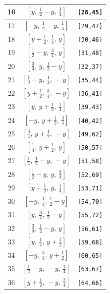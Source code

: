 \documentclass[fleqn,8pt]{jsarticle}
\begin{document}
\begin{longtable}{ccc}
16 & $\left[ y,\, \frac{1}{2} - y,\, \frac{3}{4} \right]$ & {\tt [28,45]} \\ \hline
17 & $\left[ - y,\, \frac{1}{2} - y,\, \frac{1}{4} \right]$ & {\tt [29,47]} \\ \hline
18 & $\left[ y + \frac{1}{2},\, \frac{1}{4},\, y \right]$ & {\tt [30,46]} \\ \hline
19 & $\left[ \frac{1}{2} - y,\, \frac{3}{4},\, y \right]$ & {\tt [31,48]} \\ \hline
20 & $\left[ \frac{3}{4},\, y,\, \frac{1}{2} - y \right]$ & {\tt [32,37]} \\ \hline
21 & $\left[ \frac{1}{2} - y,\, \frac{1}{4},\, - y \right]$ & {\tt [35,44]} \\ \hline
22 & $\left[ y + \frac{1}{2},\, \frac{3}{4},\, - y \right]$ & {\tt [36,41]} \\ \hline
23 & $\left[ y,\, y + \frac{1}{2},\, \frac{1}{4} \right]$ & {\tt [39,43]} \\ \hline
24 & $\left[ - y,\, y + \frac{1}{2},\, \frac{3}{4} \right]$ & {\tt [40,42]} \\ \hline
25 & $\left[ \frac{3}{4},\, y + \frac{1}{2},\, - y \right]$ & {\tt [49,62]} \\ \hline
26 & $\left[ \frac{1}{4},\, y + \frac{1}{2},\, y \right]$ & {\tt [50,57]} \\ \hline
27 & $\left[ \frac{1}{4},\, \frac{1}{2} - y,\, - y \right]$ & {\tt [51,58]} \\ \hline
28 & $\left[ \frac{1}{2} - y,\, y,\, \frac{3}{4} \right]$ & {\tt [52,69]} \\ \hline
29 & $\left[ y + \frac{1}{2},\, y,\, \frac{1}{4} \right]$ & {\tt [53,71]} \\ \hline
30 & $\left[ - y,\, \frac{1}{4},\, \frac{1}{2} - y \right]$ & {\tt [54,70]} \\ \hline
31 & $\left[ y,\, \frac{3}{4},\, \frac{1}{2} - y \right]$ & {\tt [55,72]} \\ \hline
32 & $\left[ \frac{3}{4},\, \frac{1}{2} - y,\, y \right]$ & {\tt [56,61]} \\ \hline
33 & $\left[ y,\, \frac{1}{4},\, y + \frac{1}{2} \right]$ & {\tt [59,68]} \\ \hline
34 & $\left[ - y,\, \frac{3}{4},\, y + \frac{1}{2} \right]$ & {\tt [60,65]} \\ \hline
35 & $\left[ \frac{1}{2} - y,\, - y,\, \frac{1}{4} \right]$ & {\tt [63,67]} \\ \hline
36 & $\left[ y + \frac{1}{2},\, - y,\, \frac{3}{4} \right]$ & {\tt [64,66]} \\ \hline

\end{longtable}
\end{document}
